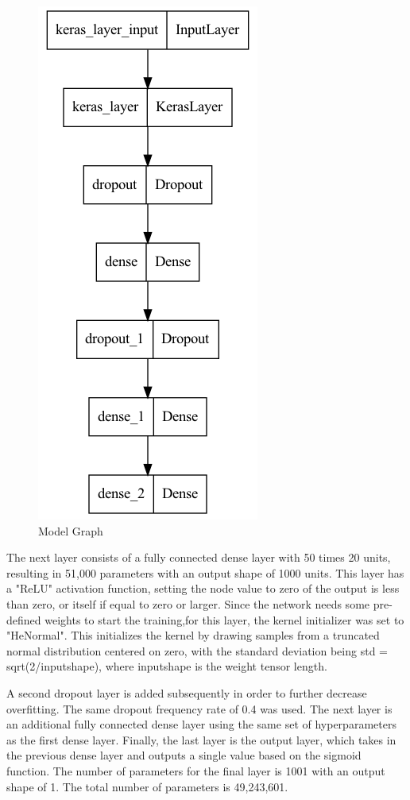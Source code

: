 \documentclass[11pt,a4paper]{article}
\begin{document}
\begin{figure}[t]
\includegraphics[scale=0.35]{model_graph.png}
\centering
\caption{Model Graph}
\label{fig:model_graph}
\end{figure}

The next layer consists of a fully connected dense layer with 50 times 20 units, resulting in 51,000 parameters with an output shape of 1000 units. This layer has a "ReLU" activation function, setting the node value to zero of the output is less than zero, or itself if equal to zero or larger. Since the network needs some pre-defined weights to start the training,for this layer, the kernel initializer was set to "HeNormal". This initializes the kernel by drawing samples from a truncated normal distribution centered on zero, with the standard deviation being std = sqrt(2/inputshape), where inputshape is the weight tensor length. 

A second dropout layer is added subsequently in order to further decrease overfitting. The same dropout frequency rate of 0.4 was used. The next layer is an additional fully connected dense layer using the same set of hyperparameters as the first dense layer. Finally, the last layer is the output layer, which takes in the previous dense layer and outputs a single value based on the sigmoid function. The number of parameters for the final layer is 1001 with an output shape of 1. The total number of parameters is 49,243,601.
\end{document}
